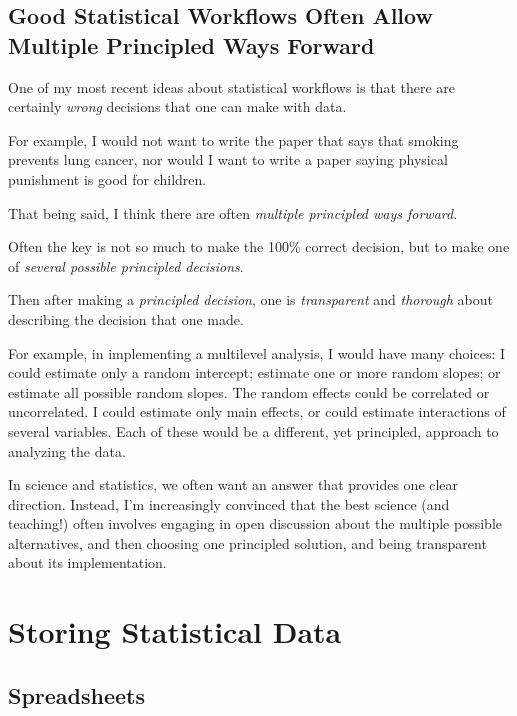 \documentclass[
  letterpaper,
  DIV=11,
  numbers=noendperiod]{scrreprt}
\begin{document}
\section{Good Statistical Workflows Often Allow Multiple Principled Ways
Forward}\label{good-statistical-workflows-often-allow-multiple-principled-ways-forward}

One of my most recent ideas about statistical workflows is that there
are certainly \emph{wrong} decisions that one can make with data.

For example, I would not want to write the paper that says that smoking
prevents lung cancer, nor would I want to write a paper saying physical
punishment is good for children.

That being said, I think there are often \emph{multiple principled ways
forward}.

Often the key is not so much to make the 100\% correct decision, but to
make one of \emph{several possible principled decisions}.

Then after making a \emph{principled decision}, one is
\emph{transparent} and \emph{thorough} about describing the decision
that one made.

For example, in implementing a multilevel analysis, I would have many
choices: I could estimate only a random intercept; estimate one or more
random slopes; or estimate all possible random slopes. The random
effects could be correlated or uncorrelated. I could estimate only main
effects, or could estimate interactions of several variables. Each of
these would be a different, yet principled, approach to analyzing the
data.

In science and statistics, we often want an answer that provides one
clear direction. Instead, I'm increasingly convinced that the best
science (and teaching!) often involves engaging in open discussion about
the multiple possible alternatives, and then choosing one principled
solution, and being transparent about its implementation.


\chapter{Storing Statistical Data}\label{storing-statistical-data-1}

\section{Spreadsheets}\label{spreadsheets}
\end{document}
